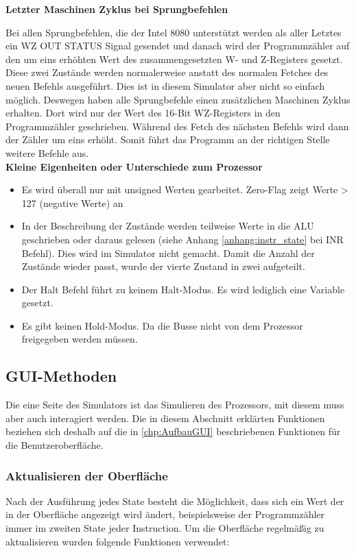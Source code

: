 \documentclass[12pt]{article}
\newcommand{\imgSpaceBefore}{\vspace{10pt}}
\begin{document}
\noindent
\textbf{Letzter Maschinen Zyklus bei Sprungbefehlen}

\noindent
Bei allen Sprungbefehlen, die der Intel 8080 unterstützt werden als aller Letztes ein WZ OUT STATUS Signal gesendet und danach wird der Programmzähler auf den um eins erhöhten Wert des zusammengesetzten W- und Z-Registers gesetzt. Diese zwei Zustände werden normalerweise anstatt des normalen Fetches des neuen Befehls ausgeführt. Dies ist in diesem Simulator aber nicht so einfach möglich. Deswegen haben alle Sprungbefehle einen zusätzlichen Maschinen Zyklus erhalten. Dort wird nur der Wert des 16-Bit WZ-Registers in den Programmzähler geschrieben. Während des Fetch des nächsten Befehls wird dann der Zähler um eins erhöht. Somit führt das Programm an der richtigen Stelle weitere Befehle aus.
\\

\noindent
\textbf{Kleine Eigenheiten oder Unterschiede zum Prozessor}

\noindent
\begin{itemize}
\item Es wird überall nur mit unsigned Werten gearbeitet. Zero-Flag zeigt Werte > 127 (negative Werte) an
\item In der Beschreibung der Zustände werden teilweise Werte in die ALU geschrieben oder daraus gelesen (siehe Anhang \ref{anhang:instr_state} bei INR Befehl). Dies wird im Simulator nicht gemacht. Damit die Anzahl der Zustände wieder passt, wurde der vierte Zustand in zwei aufgeteilt.
\item Der Halt Befehl führt zu keinem Halt-Modus. Es wird lediglich eine Variable gesetzt.
\item Es gibt keinen Hold-Modus. Da die Busse nicht von dem Prozessor freigegeben werden müssen.
\end{itemize}

\subsection{GUI-Methoden}
Die eine Seite des Simulators ist das Simulieren des Prozessors, mit diesem muss aber auch interagiert werden. Die in diesem Abschnitt erklärten Funktionen beziehen sich deshalb auf die in \ref{chp:AufbauGUI} beschriebenen Funktionen für die Benutzeroberfläche.

\subsubsection{Aktualisieren der Oberfläche}
Nach der Ausführung jedes State besteht die Möglichkeit, dass sich ein Wert der in der Oberfläche angezeigt wird ändert, beispielsweise der Programmzähler immer im zweiten State jeder Instruction. Um die Oberfläche regelmäßig zu aktualisieren wurden folgende Funktionen verwendet:\imgSpaceBefore
\end{document}
